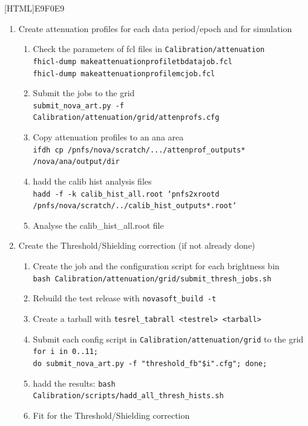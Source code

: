 \documentclass[12pt,a4paper]{article}
\begin{document}
\hspace*{-9mm}
[HTML]{E9F0E9}{
\hspace*{-5mm}
\parbox{1.02\textwidth}{
\begin{enumerate}
\item Create attenuation profiles for each data period/epoch and for simulation
\begin{enumerate}
\item Check the parameters of fcl files in \texttt{Calibration/attenuation}\\ \texttt{fhicl-dump makeattenuationprofiletbdatajob.fcl}\\
\texttt{fhicl-dump makeattenuationprofilemcjob.fcl}
\item Submit the jobs to the grid\\
\texttt{submit\_nova\_art.py -f Calibration/attenuation/grid/attenprofs.cfg}
\item Copy attenuation profiles to an ana area\\
\texttt{ifdh cp /pnfs/nova/scratch/.../attenprof\_outputs* /nova/ana/output/dir}
\item hadd the calib hist analysis files\\
\texttt{hadd -f -k calib\_hist\_all.root `pnfs2xrootd /pnfs/nova/scratch/../calib\_hist\_outputs*.root`}
\item Analyse the calib\_hist\_all.root file
\end{enumerate}
\item Create the Threshold/Shielding correction (if not already done)
\begin{enumerate}
\item Create the job and the configuration script for each brightness bin\\
\texttt{bash Calibration/attenuation/grid/submit\_thresh\_jobs.sh}
\item Rebuild the test release with \texttt{novasoft\_build -t}
\item Create a tarball with \texttt{tesrel\_tabrall <testrel> <tarball>}
\item Submit each config script in \texttt{Calibration/attenuation/grid} to the grid\\
\texttt{for i in {0..11};}\\ \texttt{do submit\_nova\_art.py -f "threshold\_fb"\$i".cfg"; done;}
\item hadd the results: \texttt{bash Calibration/scripts/hadd\_all\_thresh\_hists.sh}
\item Fit for the Threshold/Shielding correction\\

\end{enumerate}
\end{enumerate}}}
\end{document}
